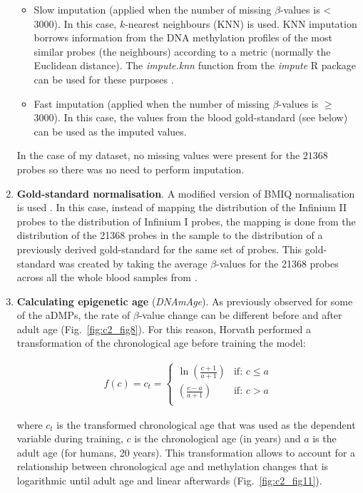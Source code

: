 \begin{enumerate}
\begin{itemize}
		\item Slow imputation (applied when the number of missing $\beta$-values is < 3000). In this case, $k$-nearest neighbours (\acrshort{KNN}) is used. KNN imputation borrows information from the DNA methylation profiles of the most similar probes (the neighbours) according to a metric (normally the Euclidean distance). The \textit{impute.knn} function from the \textit{impute} R package can be used for these purposes \citep{Troyanskaya2001}.
		
		\item Fast imputation (applied when the number of missing $\beta$-values is $\geq$ 3000). In this case, the values from the blood gold-standard (see below) can be used as the imputed values.
		
	\end{itemize}
	
	In the case of my dataset, no missing values were present for the $21368$ probes so there was no need to perform imputation.
	
	\item \textbf{Gold-standard normalisation}. A modified version of BMIQ normalisation is used \citep{Teschendorff2012}. In this case, instead of mapping the distribution of the Infinium II probes to the distribution of Infinium I probes, the mapping is done from the distribution of the 21368 probes in the sample to the distribution of a previously derived gold-standard for the same set of probes. This gold-standard was created by taking the average $\beta$-values for the 21368 probes across all the whole blood samples from \citep{Horvath2012}.
	
	\item \textbf{Calculating epigenetic age} (\textit{DNAmAge}). As previously observed for some of the aDMPs, the rate of $\beta$-value change can be different before and after adult age (Fig.~\ref{fig:c2_fig8}). For this reason, Horvath performed a transformation of the chronological age before training the model:
	
	\begin{align}
	f(c) = c_t =  
	\begin{cases}
	\ln\left(\frac{c+1}{a+1}\right) &\text{if: } c\leq a \\
	\left(\frac{c-a}{a+1}\right) &\text{if: } c>a \\
	\end{cases}
	\end{align} 
	
	where $c_t$ is the transformed chronological age that was used as the dependent variable during training, $c$ is the chronological age (in years) and $a$ is the adult age (for humans, 20 years). This transformation allows to account for a relationship between chronological age and methylation changes that is logarithmic until adult age and linear afterwards (Fig.~\ref{fig:c2_fig11}). 
	

\end{enumerate}

